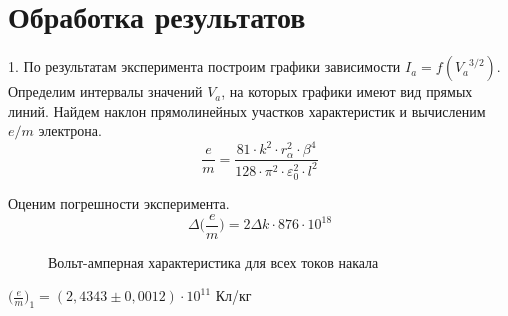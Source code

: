 \documentclass[a4paper,12pt]{article}
\begin{document}
\section{Обработка результатов}

\par 1. По результатам эксперимента построим графики зависимости $I_a = f({V_a}^{3/2})$. Определим интервалы значений $V_a$, на которых графики имеют вид прямых линий. Найдем наклон прямолинейных участков характеристик и вычисленим $e/m$ электрона.
\begin{equation}
\frac{e}{m} = \frac{81 \cdot k^2 \cdot r_{\alpha}^2 \cdot \beta^4}{128 \cdot \pi^2 \cdot \varepsilon_0^2 \cdot l^2}
\end{equation}

\par Оценим погрешности эксперимента.
\begin{equation}
\Delta \big(\frac{e}{m}\big) = 2\Delta k \cdot 876 \cdot 10^{18}
\end{equation}

\begin{figure} 
	\centering
	\caption{Вольт-амперная характеристика для всех токов накала}
	\label{mah}
\end{figure}

\par $\big(\frac{e}{m}\big)_1 = (2,4343 \pm 0,0012) \cdot 10^{11}$ Кл/кг
\end{document}
